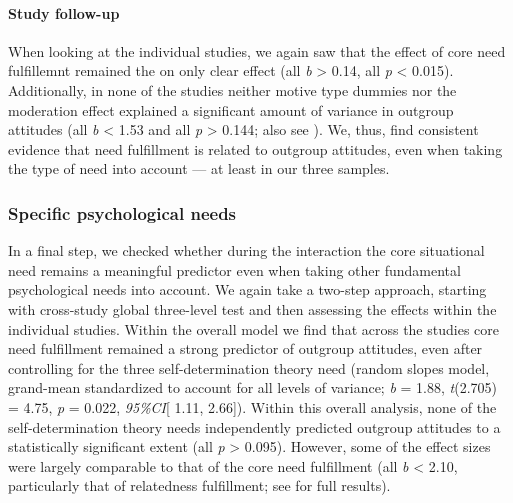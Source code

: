 \paragraph{Study follow-up}

When looking at the individual studies, we again saw that the effect of
core need fulfillemnt remained the on only clear effect (all
\textbar{}\textit{b}\textbar{} \textgreater{} 0.14, all \textit{p}
\textless{} 0.015). Additionally, in none of the studies neither motive
type dummies nor the moderation effect explained a significant amount of
variance in outgroup attitudes (all \textbar{}\textit{b}\textbar{}
\textless{} 1.53 and all \textit{p} \textgreater{} 0.144; also see
). We, thus, find consistent evidence that
need fulfillment is related to outgroup attitudes, even when taking the
type of need into account --- at least in our three samples.

\subsubsection{Specific psychological needs}

In a final step, we checked whether during the interaction the core
situational need remains a meaningful predictor even when taking other
fundamental psychological needs into account. We again take a two-step
approach, starting with cross-study global three-level test and then
assessing the effects within the individual studies. Within the overall
model we find that across the studies core need fulfillment remained a
strong predictor of outgroup attitudes, even after controlling for the
three self-determination theory need (random slopes model, grand-mean
standardized to account for all levels of variance; \textit{b} = 1.88,
\textit{t}(2.705) = 4.75, \textit{p} = 0.022, \textit{95\%CI}{[} 1.11,
2.66{]}). Within this overall analysis, none of the self-determination
theory needs independently predicted outgroup attitudes to a
statistically significant extent (all \textit{p} \textgreater{} 0.095).
However, some of the effect sizes were largely comparable to that of the
core need fulfillment (all \textbar{}\textit{b}\textbar{} \textless{}
2.10, particularly that of relatedness fulfillment; see
 for full results).


